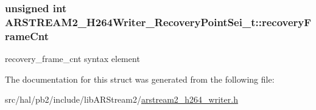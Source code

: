 \subsubsection[{\texorpdfstring{recovery\+Frame\+Cnt}{recoveryFrameCnt}}]{\setlength{\rightskip}{0pt plus 5cm}unsigned int A\+R\+S\+T\+R\+E\+A\+M2\+\_\+\+H264\+Writer\+\_\+\+Recovery\+Point\+Sei\+\_\+t\+::recovery\+Frame\+Cnt}\hypertarget{struct_a_r_s_t_r_e_a_m2___h264_writer___recovery_point_sei__t_ae31b048f103a14087cf1c1e2cea1f816}{}\label{struct_a_r_s_t_r_e_a_m2___h264_writer___recovery_point_sei__t_ae31b048f103a14087cf1c1e2cea1f816}
recovery\+\_\+frame\+\_\+cnt syntax element 

The documentation for this struct was generated from the following file\+:\begin{DoxyCompactItemize}
\item 
src/hal/pb2/include/lib\+A\+R\+Stream2/\hyperlink{arstream2__h264__writer_8h}{arstream2\+\_\+h264\+\_\+writer.\+h}\end{DoxyCompactItemize}
